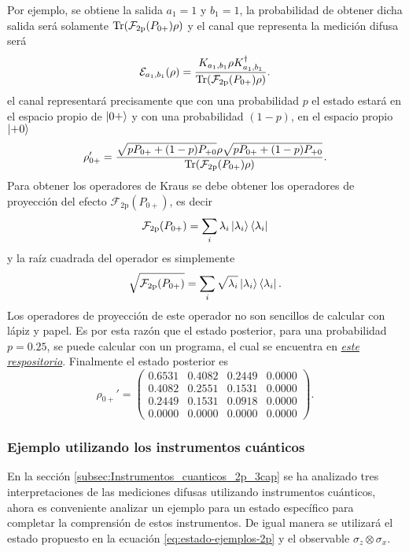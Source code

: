 
Por ejemplo, se obtiene la salida  $a_1=1$ y  $b_{1}=1$, la probabilidad de obtener dicha salida será solamente \({\rm Tr}(\mathcal{F}_{2\text{p}}(P_{0+})\rho)\)
y el canal que representa la medición difusa será \[\mathcal{E}_{a_1 ,b_1} (\rho) = \dfrac{K_{a_1 ,b_1} \rho K^\dagger_{a_1 ,b_1}}{{\rm Tr}(\mathcal{F}_{2\text{p}}(P_{0+})\rho)}. \] el canal representará precisamente que con una probabilidad $p$ el estado estará en el espacio propio de $\ket{0+}$ y con una probabilidad $(1 - p)$, en el espacio propio $\ket{+0}$
\[\rho'_{0+}=\dfrac{\sqrt{p P_{0+}+(1-p)P_{+0}}\rho\sqrt{p P_{0+}+(1-p)P_{+0}}}{{\rm Tr}(\mathcal{F}_{2\text{p}}(P_{0+})\rho)}.\] Para obtener los operadores de Kraus se debe obtener los operadores de proyección del efecto $\mathcal{F}_{2\text{p}}(P_{0+})$, es decir \[\mathcal{F}_{2\text{p}}(P_{0+})= \sum_i \lambda_i \ket{\lambda_i}\bra{\lambda_i}\] y la raíz cuadrada del operador es simplemente \[\sqrt{\mathcal{F}_{2\text{p}}(P_{0+})}=\sum_i \sqrt{\lambda_i} \ket{\lambda_i}\bra{\lambda_i}.\] 
Los operadores de proyección de este operador no son sencillos de calcular con lápiz y papel. Es por esta razón que el estado posterior, para una probabilidad $p=0.25$, se puede calcular con un programa, el cual se encuentra en \href{https://github.com/Mohs9/Practicas_Tesis/blob/bca73a98e2a7a5e3020436e42fcb1ebec38831cb/Tesis/Code/descripcion2particulas.py}{\textit{este respositorio}}.  Finalmente el estado posterior es \[\rho_{0+}'=\begin{pmatrix}
    0.6531 &  0.4082 &  0.2449 &  0.0000\\
    0.4082 &  0.2551 &  0.1531 &  0.0000\\
    0.2449 &  0.1531 &  0.0918 &  0.0000\\
    0.0000 &  0.0000 &  0.0000 &  0.0000
  \end{pmatrix}.\]





\subsubsection{Ejemplo utilizando los instrumentos cuánticos} %


En la sección {\ref{subsec:Instrumentos_cuanticos_2p_3cap}} se ha analizado tres interpretaciones de las mediciones difusas utilizando instrumentos cuánticos, ahora es conveniente analizar un ejemplo para un estado específico para completar la comprensión de estos instrumentos. De igual manera se utilizará el estado propuesto en la ecuación {\eqref{eq:estado-ejemplos-2p}} y el observable $\sigma_z\otimes\sigma_x$.

